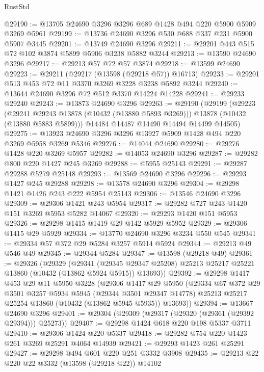 \begin{lexlean}{RustStd}
\begin{coremodule}
@29190 := @13705 @24690 @3296 @3296 @689 @1428 @494 @220 @5900 @5909 @3269 @5961
@29199 := @13736 @24690 @3296 @530 @688 @337 @231 @5900 @5907 @3445
@29201 := @13749 @24690 @3296
@29211 := @29201 @443 @515 @72 @102 @3874 @5899 @5906 @3238 @5882 @3244
@29213 := @13590 @24690 @3296
@29217 := @29213 @57 @72 @57 @3874
@29218 := @13599 @24690
@29223 := @29211 (@29217 (@13598 (@29218 @57)) @16713)
@29233 := @29201 @513 @453 @72 @11 @3370 @3269 @3228 @3238 @5892 @3244
@29240 := @13644 @24690 @3296 @72 @512 @3370 @14224 @14228
@29241 := @29233 @29240
@29243 := @13873 @24690 @3296
@29263 := @29190
    (@29199
      (@29223
        (@29241 @29243 @13878 (@10432 (@13880 @5893 @3269)))
        @13878
        (@10432 (@13880 @5883 @5899)))
      @14484
      @14487
      @14490
      @14494
      @14499
      @14505)
@29275 := @13923 @24690 @3296 @3296 @13927 @5909 @1428 @494 @220 @3269 @5958 @3269 @5346
@29276 := @14044 @24690
@29280 := @29276 @1428 @220 @3269 @5957
@29282 := @14053 @24690 @3296
@29287 := @29282 @800 @220 @1427 @245 @3269
@29288 := @5955 @25143
@29291 := @29287 @29288 @5279 @25148
@29293 := @13569 @24690 @3296
@29296 := @29293 @1427 @245 @29288
@29298 := @13578 @24690 @3296
@29304 := @29298 @1421 @1426 @243 @222 @5954 @25143
@29306 := @13546 @24690 @3296
@29309 := @29306 @1421 @243 @5954
@29317 := @29282 @727 @243 @1420 @151 @3269 @5953 @5282 @14067
@29320 := @29293 @1420 @151 @5953
@29326 := @29298 @1415 @1419 @29 @142 @5929 @5952
@29329 := @29306 @1415 @29 @5929
@29334 := @13770 @24690 @3296 @3234 @550 @545
@29341 := @29334 @57 @372 @29 @5284 @3257 @5914 @5924
@29344 := @29213 @49 @546 @49
@29345 := @29344 @5284
@29347 := @13598 (@29218 @49)
@29361 := @29326
    (@29329
      (@29341
        (@29345 @29347 @25208)
        @25213
        @25217
        @25221
        @13860
        (@10432 (@13862 @5924 @5915))
        @13693))
@29392 := @29298
    @1417
    @453
    @29
    @11
    @5950
    @3228
    (@29306
      @1417
      @29
      @5950
      (@29334
        @67
        @372
        @29
        @3501
        @3257
        @5934
        @5945
        (@29344 @3501 @29347 @14778)
        @25213
        @25217
        @25254
        @13860
        (@10432 (@13862 @5945 @5935))
        @13693))
@29394 := @13667 @24690 @3296
@29401 := @29304 (@29309 (@29317 (@29320 (@29361 (@29392 @29394))) @25273))
@29407 := @29298 @1424 @618 @220 @198 @5337 @3711
@29410 := @29306 @1424 @220 @5337
@29418 := @29282 @754 @220 @1423 @261 @3269 @25291 @4064 @14939
@29421 := @29293 @1423 @261 @25291
@29427 := @29298 @494 @601 @220 @251 @3332 @3908
@29435 := @29213 @22 @220 @22 @3332 (@13598 (@29218 @22)) @14102

\end{coremodule}
\end{lexlean}
